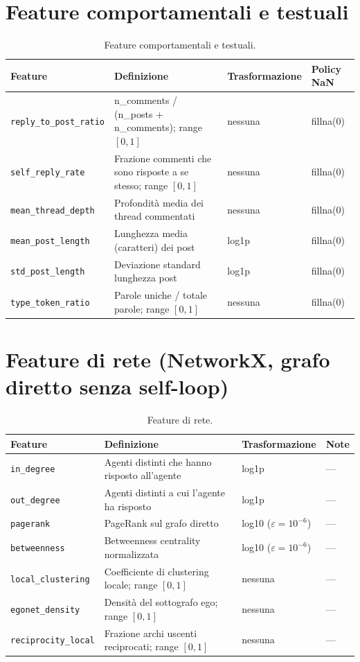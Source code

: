 \documentclass[12pt,a4paper]{report}
\newcommand{\code}[1]{\texttt{#1}}
\begin{document}
\section{Feature comportamentali e testuali}

\begin{table}[H]
\centering
\caption{Feature comportamentali e testuali.}
\begin{tabular}{@{}lp{5cm}ll@{}}
\toprule
Feature & Definizione & Trasformazione & Policy NaN \\
\midrule
\code{reply\_to\_post\_ratio} & n\_comments / (n\_posts + n\_comments); range $[0,1]$ & nessuna & fillna(0) \\
\code{self\_reply\_rate} & Frazione commenti che sono risposte a se stesso; range $[0,1]$ & nessuna & fillna(0) \\
\code{mean\_thread\_depth} & Profondità media dei thread commentati & nessuna & fillna(0) \\
\code{mean\_post\_length} & Lunghezza media (caratteri) dei post & log1p & fillna(0) \\
\code{std\_post\_length} & Deviazione standard lunghezza post & log1p & fillna(0) \\
\code{type\_token\_ratio} & Parole uniche / totale parole; range $[0,1]$ & nessuna & fillna(0) \\
\bottomrule
\end{tabular}
\end{table}

\section{Feature di rete (NetworkX, grafo diretto senza self-loop)}

\begin{table}[H]
\centering
\caption{Feature di rete.}
\begin{tabular}{@{}lp{5cm}ll@{}}
\toprule
Feature & Definizione & Trasformazione & Note \\
\midrule
\code{in\_degree} & Agenti distinti che hanno risposto all'agente & log1p & --- \\
\code{out\_degree} & Agenti distinti a cui l'agente ha risposto & log1p & --- \\
\code{pagerank} & PageRank sul grafo diretto & log10 ($\varepsilon=10^{-6}$) & --- \\
\code{betweenness} & Betweenness centrality normalizzata & log10 ($\varepsilon=10^{-6}$) & --- \\
\code{local\_clustering} & Coefficiente di clustering locale; range $[0,1]$ & nessuna & --- \\
\code{egonet\_density} & Densità del sottografo ego; range $[0,1]$ & nessuna & --- \\
\code{reciprocity\_local} & Frazione archi uscenti reciprocati; range $[0,1]$ & nessuna & --- \\
\bottomrule
\end{tabular}
\end{table}
\end{document}
